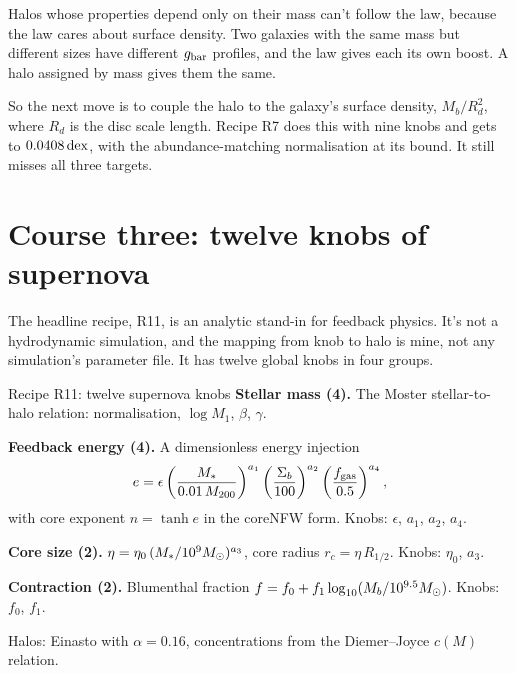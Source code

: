 Halos whose properties depend only on their mass can't follow the law, because the law cares about surface density. Two galaxies with the same mass but different sizes have different $g_{\rm bar}$ profiles, and the law gives each its own boost. A halo assigned by mass gives them the same.



So the next move is to couple the halo to the galaxy's surface density, $M_b/R_d^2$, where $R_d$ is the disc scale length. Recipe R7 does this with nine knobs and gets to $0.0408\,\mathrm{dex}$, with the abundance-matching normalisation at its bound. It still misses all three targets.

\section{Course three: twelve knobs of supernova}

The headline recipe, R11, is an analytic stand-in for feedback physics. It's not a hydrodynamic simulation, and the mapping from knob to halo is mine, not any simulation's parameter file. It has twelve global knobs in four groups.

\begin{knobbox}{Recipe R11: twelve supernova knobs}
\textbf{Stellar mass (4).} The Moster stellar-to-halo relation: normalisation, $\log M_1$, $\beta$, $\gamma$.

\textbf{Feedback energy (4).} A dimensionless energy injection
\[
e=\epsilon\left(\frac{M_*}{0.01\,M_{200}}\right)^{a_1}\left(\frac{\Sigma_b}{100}\right)^{a_2}\left(\frac{f_{\rm gas}}{0.5}\right)^{a_4},
\]
with core exponent $n=\tanh e$ in the coreNFW form. Knobs: $\epsilon$, $a_1$, $a_2$, $a_4$.

\textbf{Core size (2).} $\eta=\eta_0\,(M_*/10^9M_\odot)^{a_3}$, core radius $r_c=\eta\,R_{1/2}$. Knobs: $\eta_0$, $a_3$.

\textbf{Contraction (2).} Blumenthal fraction $f=f_0+f_1\log_{10}(M_b/10^{9.5}M_\odot)$. Knobs: $f_0$, $f_1$.

\medskip
Halos: Einasto with $\alpha=0.16$, concentrations from the Diemer--Joyce $c(M)$ relation.
\end{knobbox}

